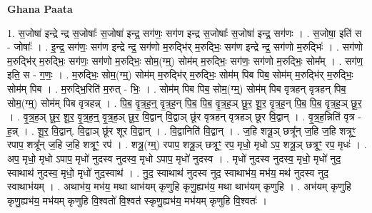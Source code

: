 \documentclass[17pt]{extarticle}
\begin{document}
\textbf{Ghana Paata } \newline

1. स॒जोषा॑ इन्द्रे न्द्र स॒जोषाः᳚ स॒जोषा॑ इन्द्र॒ सग॑णः॒ सग॑ण इन्द्र स॒जोषाः᳚ स॒जोषा॑ इन्द्र॒ सग॑णः । . स॒जोषा॒ इति॑ स - जोषाः᳚ । . इ॒न्द्र॒ सग॑णः॒ सग॑ण इन्द्रे न्द्र॒ सग॑णो म॒रुद्भि॑र् म॒रुद्भिः॒ सग॑ण इन्द्रे न्द्र॒ सग॑णो म॒रुद्भिः॑ । . सग॑णो म॒रुद्भि॑र् म॒रुद्भिः॒ सग॑णः॒ सग॑णो म॒रुद्भिः॒ सोम॒(ग्म्॒) सोम॑म् म॒रुद्भिः॒ सग॑णः॒ सग॑णो म॒रुद्भिः॒ सोम᳚म् । . सग॑ण॒ इति॒ स - ग॒णः॒ । . म॒रुद्भिः॒ सोम॒(ग्म्॒) सोम॑म् म॒रुद्भि॑र् म॒रुद्भिः॒ सोम॑म् पिब पिब॒ सोम॑म् म॒रुद्भि॑र् म॒रुद्भिः॒ सोम॑म् पिब । . म॒रुद्भि॒रिति॑ म॒रुत् - भिः॒ । . सोम॑म् पिब पिब॒ सोम॒(ग्म्॒) सोम॑म् पिब वृत्रहन् वृत्रहन् पिब॒ सोम॒(ग्म्॒) सोम॑म् पिब वृत्रहन्न् । . पि॒ब॒ वृ॒त्र॒ह॒न्॒ वृ॒त्र॒ह॒न् पि॒ब॒ पि॒ब॒ वृ॒त्र॒ह॒ञ् छू॒र॒ शू॒र॒ वृ॒त्र॒ह॒न् पि॒ब॒ पि॒ब॒ वृ॒त्र॒ह॒ञ् छू॒र॒ । . वृ॒त्र॒ह॒ञ् छू॒र॒ शू॒र॒ वृ॒त्र॒ह॒न्॒ वृ॒त्र॒ह॒ञ् छू॒र॒ वि॒द्वान् वि॒द्वाञ् छू॑र वृत्रहन् वृत्रहञ् छूर वि॒द्वान् । . वृ॒त्र॒ह॒न्निति॑ वृत्र - ह॒न्न् । . शू॒र॒ वि॒द्वान्. वि॒द्वाञ् छू॑र शूर वि॒द्वान् । . वि॒द्वानिति॑ वि॒द्वान् । . ज॒हि शत्रू॒ञ् छत्रू᳚न् ज॒हि ज॒हि शत्रूꣳ॒॒ रपाप॒ शत्रू᳚न् ज॒हि ज॒हि शत्रूꣳ॒॒ रप॑ । . शत्रू॒(ग्म्॒) रपाप॒ शत्रू॒ञ् छत्रूꣳ॒॒ रप॒ मृधो॒ मृधो ऽप॒ शत्रू॒ञ् छत्रूꣳ॒॒ रप॒ मृधः॑ । . अप॒ मृधो॒ मृधो ऽपाप॒ मृधो॑ नुदस्व नुदस्व॒ मृधो ऽपाप॒ मृधो॑ नुदस्व । . मृधो॑ नुदस्व नुदस्व॒ मृधो॒ मृधो॑ नुद॒ स्वाथाथ॑ नुदस्व॒ मृधो॒ मृधो॑ नुद॒स्वाथ॑ । . नु॒द॒ स्वाथाथ॑ नुदस्व नुद॒ स्वाथाभ॑य॒ मभ॑य॒ मथ॑ नुदस्व नुद॒ स्वाथाभ॑यम् । . अथाभ॑य॒ मभ॑य॒ मथा थाभ॑यम् कृणुहि कृणु॒ह्यभ॑य॒ मथा थाभ॑यम् कृणुहि । . अभ॑यम् कृणुहि कृणु॒ह्यभ॑य॒ मभ॑यम् कृणुहि वि॒श्वतो॑ वि॒श्वत॑ स्कृणु॒ह्यभ॑य॒ मभ॑यम् कृणुहि वि॒श्वतः॑ । \newline
\end{document}
